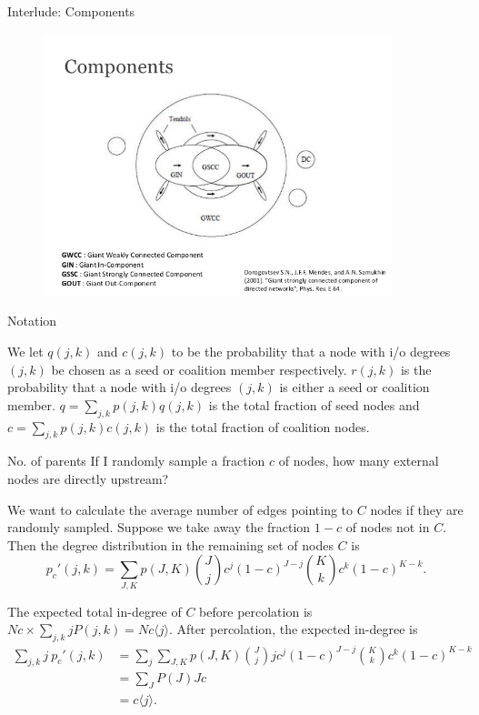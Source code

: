 \documentclass[10pt]{beamer}
\begin{document}
\begin{frame}{Interlude: Components}

\begin{figure}[b]
\centering
\includegraphics[width=4in]{gscc.jpg}
\end{figure}
\end{frame}
\begin{frame}{Notation}

We let $q(j,k)$ and $c(j,k)$ to be the probability that a node with i/o degrees $(j,k)$ be chosen as a seed or coalition member respectively. $r(j,k)$ is the probability that a node with i/o degrees $(j,k)$ is either a seed or coalition member. $q = \sum_{j,k} p(j,k) q(j,k)$ is the total fraction of seed nodes and $c = \sum_{j,k} p(j,k) c(j,k)$ is the total fraction of coalition nodes.

\end{frame}


\begin{frame}{No. of parents}
If I randomly sample a fraction $c$ of nodes, how many external nodes are directly upstream?

We want to calculate the average number of edges pointing to $C$ nodes if they are randomly sampled. Suppose we take away the fraction $1-c$ of nodes not in $C$. Then the degree distribution in the remaining set of nodes $C$ is
\begin{equation}
p_c'(j,k) = \sum_{J, K} p(J,K) {J \choose j} c^j(1-c)^{J-j} {K \choose k} c^k(1-c)^{K-k}.
\end{equation}
\end{frame}

\begin{frame}

The expected total in-degree of $C$ before percolation is $Nc \times \sum_{j,k} j P(j,k) = Nc\langle j \rangle$. After percolation, the expected in-degree is
\begin{align}
\sum_{j,k} j\ p_c'(j,k) &= \sum_j \sum_{J, K} p(J,K) {J \choose j} j c^j(1-c)^{J-j} {K \choose k} c^k(1-c)^{K-k} \\
&= \sum_{J} P(J) Jc \\
&= c\langle j\rangle.
\end{align}
\end{frame}
\end{document}
